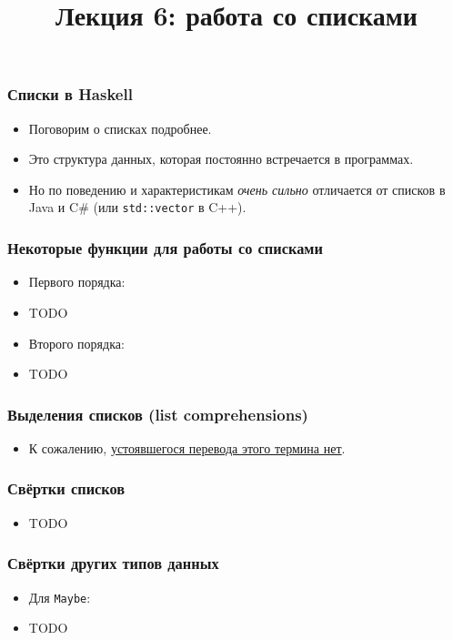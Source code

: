 \documentclass[11pt]{beamer}
\title{Лекция 6: работа со списками}
\begin{document}
\begin{frame}[plain]
\maketitle
\end{frame}

\begin{frame}[fragile]
\frametitle{Списки в Haskell}
\begin{itemize}
    \item Поговорим о списках подробнее.
    \item Это структура данных, которая постоянно встречается в программах.
    \item Но по поведению и характеристикам \emph{очень сильно} отличается от списков в Java и C\# (или \lstinline|std::vector| в C++).
\end{itemize}
\end{frame}

\begin{frame}[fragile]
\frametitle{Некоторые функции для работы со списками}
\begin{itemize}
    \item Первого порядка:
    \item TODO
    \item Второго порядка:
    \item TODO
\end{itemize}
\end{frame}

\begin{frame}[fragile]
\frametitle{Выделения списков (list comprehensions)}
\begin{itemize}
    \item К сожалению, \href{https://ru.wikipedia.org/wiki/Списковое_включение}{устоявшегося перевода этого термина нет}.
\end{itemize}
\end{frame}

\begin{frame}[fragile]
\frametitle{Свёртки списков}
\begin{itemize}
    \item TODO
\end{itemize}
\end{frame}

\begin{frame}[fragile]
\frametitle{Свёртки других типов данных}
\begin{itemize}
    \item Для \lstinline|Maybe|:
    \item TODO
\end{itemize}
\end{frame}
\end{document}
